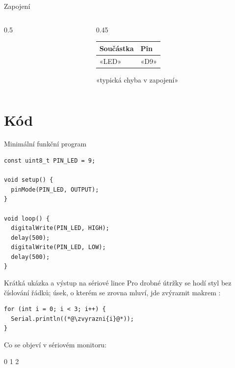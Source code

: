 \documentclass[12pt,aspectratio=169]{beamer}
\begin{document}
\begin{frame}{Zapojení}
  \begin{columns}[T]
    \begin{column}{0.5\textwidth}
    \end{column}
    \begin{column}{0.45\textwidth}
      \small
      \begin{tabular}{ll}
        \toprule
        Součástka & Pin \\
        \midrule
        «LED» & «D9» \\
        \bottomrule
      \end{tabular}
      \vspace{3mm}

       «typická chyba v zapojení»
    \end{column}
  \end{columns}
\end{frame}

\section{Kód}

\begin{frame}[fragile]{Minimální funkční program}
\begin{lstlisting}
const uint8_t PIN_LED = 9;

void setup() {
  pinMode(PIN_LED, OUTPUT);
}

void loop() {
  digitalWrite(PIN_LED, HIGH);
  delay(500);
  digitalWrite(PIN_LED, LOW);
  delay(500);
}
\end{lstlisting}
\end{frame}

\begin{frame}[fragile]{Krátká ukázka a výstup na sériové lince}
  Pro drobné útržky se hodí styl bez číslování řádků; úsek, o kterém se
  zrovna mluví, jde zvýraznit makrem :
\begin{lstlisting}[style=arduino_bez_cisel]
for (int i = 0; i < 3; i++) {
  Serial.println((*@\zvyrazni{i}@*));
}
\end{lstlisting}

  Co se objeví v sériovém monitoru:
\begin{vystup}
0
1
2
\end{vystup}
\end{frame}
\end{document}
